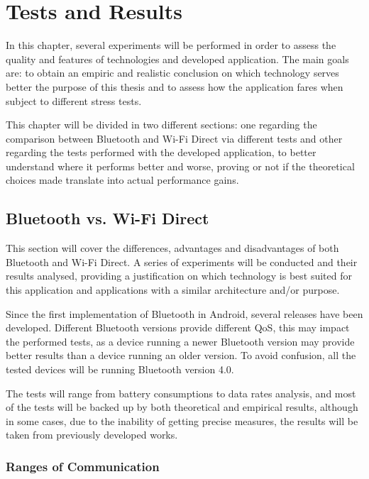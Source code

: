 \chapter{Tests and Results}
\label{tests}

In this chapter, several experiments will be performed in order to assess the quality and features of technologies and developed application. The main goals are: to obtain an empiric and realistic conclusion on which technology serves better the purpose of this thesis and to assess how the application fares when subject to different stress tests.

This chapter will be divided in two different sections: one regarding the comparison between Bluetooth and Wi-Fi Direct via different tests and other regarding the tests performed with the developed application, to better understand where it performs better and worse, proving or not if the theoretical choices made translate into actual performance gains.

\section{Bluetooth vs. Wi-Fi Direct}

This section will cover the differences, advantages and disadvantages of both Bluetooth and Wi-Fi Direct. A series of experiments will be conducted and their results analysed, providing a justification on which technology is best suited for this application and applications with a similar architecture and/or purpose.

Since the first implementation of Bluetooth in Android, several releases have been developed. Different Bluetooth versions provide different \gls{QoS}, this may impact the performed tests, as a device running a newer Bluetooth version may provide better results than a device running an older version. To avoid confusion, all the tested devices will be running Bluetooth version 4.0.

The tests will range from battery consumptions to data rates analysis, and most of the tests will be backed up by both theoretical and empirical results, although in some cases, due to the inability of getting precise measures, the results will be taken from previously developed works.

\subsection{Ranges of Communication}

